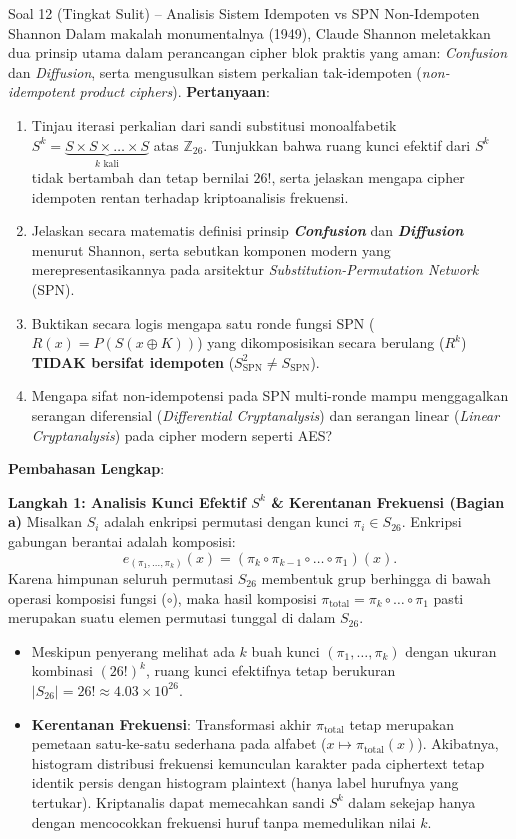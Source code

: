 \documentclass[11pt,a4paper]{article}
\begin{document}
\begin{soalsulit}{Soal 12 (Tingkat Sulit) -- Analisis Sistem Idempoten vs SPN Non-Idempoten Shannon}
Dalam makalah monumentalnya (1949), Claude Shannon meletakkan dua prinsip utama dalam perancangan cipher blok praktis yang aman: \textit{Confusion} dan \textit{Diffusion}, serta mengusulkan sistem perkalian tak-idempoten (\textit{non-idempotent product ciphers}).
\textbf{Pertanyaan}:
\begin{enumerate}[label=\alph*)]
    \item Tinjau iterasi perkalian dari sandi substitusi monoalfabetik $S^k = \underbrace{S \times S \times \dots \times S}_{k \text{ kali}}$ atas $\mathbb{Z}_{26}$. Tunjukkan bahwa ruang kunci efektif dari $S^k$ tidak bertambah dan tetap bernilai $26!$, serta jelaskan mengapa cipher idempoten rentan terhadap kriptoanalisis frekuensi.
    \item Jelaskan secara matematis definisi prinsip \textbf{\textit{Confusion}} dan \textbf{\textit{Diffusion}} menurut Shannon, serta sebutkan komponen modern yang merepresentasikannya pada arsitektur \textit{Substitution-Permutation Network} (SPN).
    \item Buktikan secara logis mengapa satu ronde fungsi SPN ($R(x) = P(S(x \oplus K))$) yang dikomposisikan secara berulang ($R^k$) \textbf{TIDAK bersifat idempoten} ($S_{\text{SPN}}^2 \neq S_{\text{SPN}}$).
    \item Mengapa sifat non-idempotensi pada SPN multi-ronde mampu menggagalkan serangan diferensial (\textit{Differential Cryptanalysis}) dan serangan linear (\textit{Linear Cryptanalysis}) pada cipher modern seperti AES?
\end{enumerate}
\end{soalsulit}

\noindent\textbf{Pembahasan Lengkap}:

\noindent\textbf{Langkah 1: Analisis Kunci Efektif $S^k$ \& Kerentanan Frekuensi (Bagian a)}
Misalkan $S_i$ adalah enkripsi permutasi dengan kunci $\pi_i \in S_{26}$. Enkripsi gabungan berantai adalah komposisi:
\[
e_{(\pi_1, \dots, \pi_k)}(x) = (\pi_k \circ \pi_{k-1} \circ \dots \circ \pi_1)(x).
\]
Karena himpunan seluruh permutasi $S_{26}$ membentuk grup berhingga di bawah operasi komposisi fungsi ($\circ$), maka hasil komposisi $\pi_{\text{total}} = \pi_k \circ \dots \circ \pi_1$ pasti merupakan suatu elemen permutasi tunggal di dalam $S_{26}$.
\begin{itemize}
    \item Meskipun penyerang melihat ada $k$ buah kunci $(\pi_1, \dots, \pi_k)$ dengan ukuran kombinasi $(26!)^k$, ruang kunci efektifnya tetap berukuran $|S_{26}| = 26! \approx 4.03 \times 10^{26}$.
    \item \textbf{Kerentanan Frekuensi}: Transformasi akhir $\pi_{\text{total}}$ tetap merupakan pemetaan satu-ke-satu sederhana pada alfabet ($x \mapsto \pi_{\text{total}}(x)$). Akibatnya, histogram distribusi frekuensi kemunculan karakter pada ciphertext tetap identik persis dengan histogram plaintext (hanya label hurufnya yang tertukar). Kriptanalis dapat memecahkan sandi $S^k$ dalam sekejap hanya dengan mencocokkan frekuensi huruf tanpa memedulikan nilai $k$.
\end{itemize}
\end{document}
